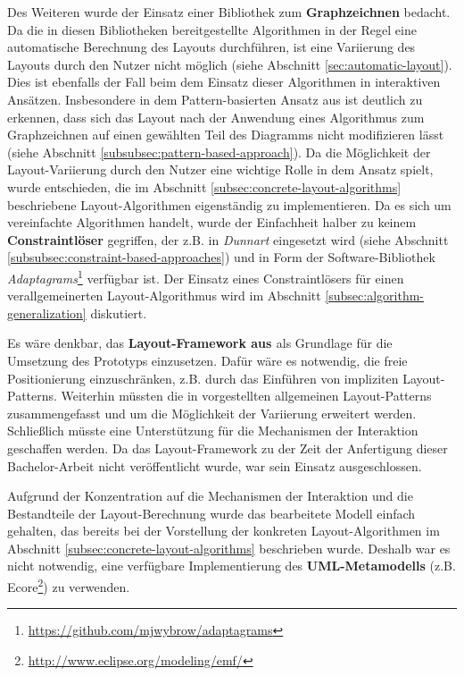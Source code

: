 Des Weiteren wurde der Einsatz einer Bibliothek zum \textbf{Graphzeichnen} bedacht. Da die in diesen Bibliotheken bereitgestellte Algorithmen in der Regel eine automatische Berechnung des Layouts durchführen, ist eine Variierung des Layouts durch den Nutzer nicht möglich (siehe Abschnitt \ref{sec:automatic-layout}). Dies ist ebenfalls der Fall beim dem Einsatz dieser Algorithmen in interaktiven Ansätzen. Insbesondere in dem Pattern-basierten Ansatz aus \cite{Maier12A-Pattern-based} ist deutlich zu erkennen, dass sich das Layout nach der Anwendung eines Algorithmus zum Graphzeichnen auf einen gewählten Teil des Diagramms nicht modifizieren lässt (siehe Abschnitt \ref{subsubsec:pattern-based-approach}). Da die Möglichkeit der Layout-Variierung durch den Nutzer eine wichtige Rolle in dem Ansatz spielt, wurde entschieden, die im Abschnitt \ref{subsec:concrete-layout-algorithms} beschriebene Layout-Algorithmen eigenständig zu implementieren. Da es sich um vereinfachte Algorithmen handelt, wurde der Einfachheit halber zu keinem \textbf{Constraintlöser} gegriffen, der z.B. in \textit{Dunnart} eingesetzt wird (siehe Abschnitt \ref{subsubsec:constraint-based-approaches}) und in Form der Software-Bibliothek \textit{Adaptagrams}\footnote{\url{https://github.com/mjwybrow/adaptagrams}} verfügbar ist. Der Einsatz eines Constraintlösers für einen verallgemeinerten Layout-Algorithmus wird im Abschnitt \ref{subsec:algorithm-generalization} diskutiert.

Es wäre denkbar, das \textbf{Layout-Framework aus \cite{Maier12A-Pattern-based}} als Grundlage für die Umsetzung des Prototyps einzusetzen. Dafür wäre es notwendig, die freie Positionierung einzuschränken, z.B. durch das Einführen von impliziten Layout-Patterns. Weiterhin müssten die in \cite{Maier12A-Pattern-based} vorgestellten allgemeinen Layout-Patterns zusammengefasst und um die Möglichkeit der Variierung erweitert werden. Schließlich müsste eine Unterstützung für die Mechanismen der Interaktion geschaffen werden. Da das Layout-Framework zu der Zeit der Anfertigung dieser Bachelor-Arbeit nicht veröffentlicht wurde, war sein Einsatz ausgeschlossen.

Aufgrund der Konzentration auf die Mechanismen der Interaktion und die Bestandteile der Layout-Berechnung wurde das bearbeitete Modell einfach gehalten, das bereits bei der Vorstellung der konkreten Layout-Algorithmen im Abschnitt \ref{subsec:concrete-layout-algorithms} beschrieben wurde. Deshalb war es nicht notwendig, eine verfügbare Implementierung des \textbf{UML-Metamodells} (z.B. Ecore\footnote{\url{http://www.eclipse.org/modeling/emf/}}) zu verwenden.

